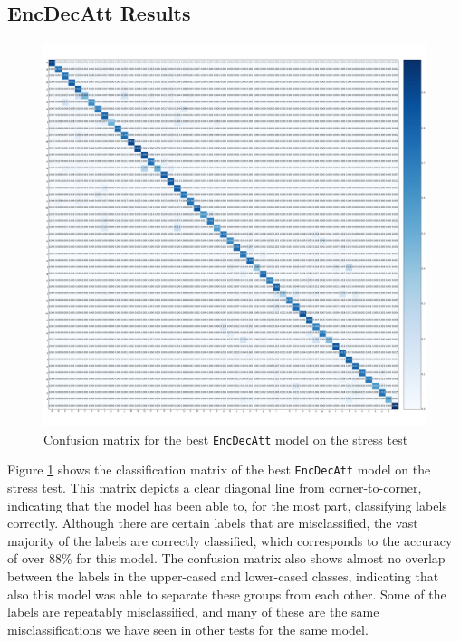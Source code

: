 \newpage
\subsection{EncDecAtt Results}
\begin{figure}[ht]
    \centering
    \includegraphics[width=1\textwidth]{fig/results/experiment4/encdecatt/confusion_matrix.png}
    \caption{Confusion matrix for the best {\tt EncDecAtt} model on the stress test}
    \label{fig:result4_encdecatt_confusion_matrix}
\end{figure}

Figure \ref{fig:result4_encdecatt_confusion_matrix} shows the classification matrix of the best {\tt EncDecAtt} model on the stress test. This matrix depicts a clear diagonal line from corner-to-corner, indicating that the model has been able to, for the most part, classifying labels correctly. Although there are certain labels that are misclassified, the vast majority of the labels are correctly classified, which corresponds to the accuracy of over 88\% for this model. The confusion matrix also shows almost no overlap between the labels in the upper-cased and lower-cased classes, indicating that also this model was able to separate these groups from each other. Some of the labels are repeatably misclassified, and many of these are the same misclassifications we have seen in other tests for the same model.

